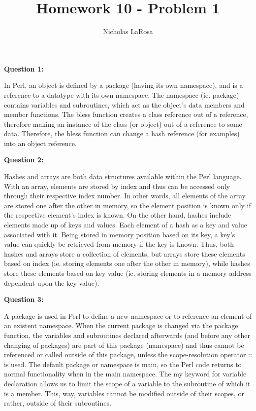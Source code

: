 \documentclass{article}
\begin{document}
\title{Homework 10 - Problem 1}
\author{Nicholas LaRosa}

\maketitle

\large{\textbf{Question 1:}}
	
In Perl, an object is defined by a package (having its own namespace), and is a reference
to a datatype with its own namespace. The namespace (ie. package) contains variables and
subroutines, which act as the object's data members and member functions. The bless function
creates a class reference out of a reference, therefore making an instance of the class
(or object) out of a reference to some data. Therefore, the bless function can change a
hash reference (for examples) into an object reference.

\large{\textbf{Question 2:}}

Hashes and arrays are both data structures available within the Perl language. With an
array, elements are stored by index and thus can be accessed only through their respective
index number. In other words, all elements of the array are stored one after the other in
memory, so the element position is known only if the respective element's index is known.
On the other hand, hashes include elements made up of keys and values. Each element of a
hash as a key and value associated with it. Being stored in memory position based on its
key, a key's value can quickly be retrieved from memory if the key is known. Thus, both
hashes and arrays store a collection of elements, but arrays store these elements based
on index (ie. storing elements one after the other in memory), while hashes store these
elements based on key value (ie. storing elements in a memory address dependent upon the
key value).

\large{\textbf{Question 3:}}

A package is used in Perl to define a new namespace or to reference an element of
an existent namespace. When the current package is changed via the package function, the
variables and subroutines declared afterwards (and before any other changing of packages)
are part of this package (namespace) and thus cannot be referenced or called outside of
this package, unless the scope-resolution operator :: is used. The default package or
namespace is main, so the Perl code returns to normal functionality when in the main
namespace. The my keyword for variable declaration allows us to limit the scope of a
variable to the subroutine of which it is a member. This, way, variables cannot be
modified outside of their scopes, or rather, outside of their subroutines.
\end{document}
